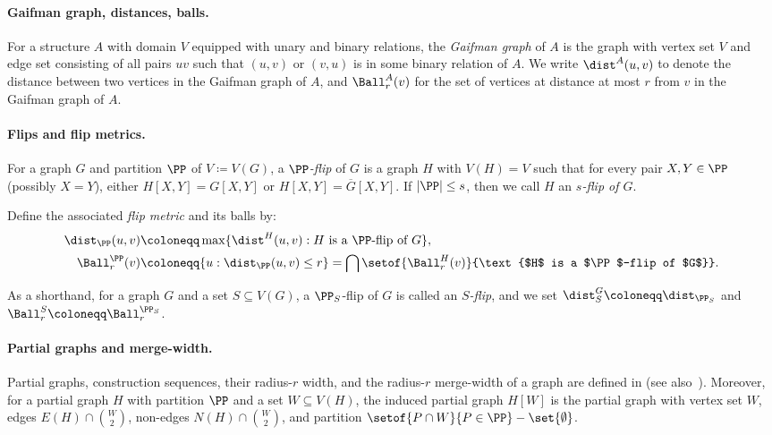 \paragraph{Gaifman graph, distances, balls.}
For a structure $A$ with domain $V$ equipped with unary and binary relations, the \emph{Gaifman graph} of $A$ is the graph
with vertex set $V$ and edge set consisting of all pairs $uv$ such that
$(u,v)$ or $(v,u)$ is in some binary relation of $A$.
We write $\dist^A(u,v)$ to denote the distance between two vertices in the Gaifman graph of $A$, and $\Ball^A_r(v)$  for the set of vertices at distance at most $r$ from $v$ in the Gaifman graph of $A$.

\paragraph{Flips and flip metrics.}
For a graph $G$ and partition $\PP$ of $V\coloneqq V(G)$, a \emph{$\PP$-flip} of $G$ is a graph $H$ with $V(H)=V$ such that for every pair $X,Y\in \PP$
(possibly $X=Y$), either
$H[X,Y]=G[X,Y]$ or $H[X,Y]=\overline G[X,Y]$.
If $|\PP| \leq s$, then we call $H$ an \emph{$s$-flip of $G$}.

Define the associated \emph{flip metric} and its balls by:
\begin{align*}
  \dist_\PP(u,v)&\coloneqq
  \max\{\dist^H(u,v):H\text{ is a $\PP$-flip of }G\},
  \\
  \Ball^\PP_r(v)&\coloneqq\{u:\dist_\PP(u,v)\le r\}=\bigcap\setof{\Ball^H_r(v)}{\text{$H$ is a $\PP$-flip of $G$}}.
\end{align*}

As a shorthand, for a graph $G$ and a set $S\subseteq V(G)$, a $\PP_S$-flip of $G$ is called an \emph{$S$-flip}, and we set $\dist_S^G \coloneqq \dist_{\PP_S}$ and $\Ball_r^S \coloneqq \Ball_r^{\PP_S}$.

\paragraph{Partial graphs and merge-width.}
Partial graphs, construction sequences, their radius-$r$ width, and the radius-$r$ merge-width of a graph are defined in  (see also~\cite{mw-stoc}).
Moreover, for a partial graph $H$ with partition $\PP$ and a set $W\subseteq V(H)$, the induced partial graph $H[W]$ is the partial graph with vertex set $W$,
edges $E(H)\cap {W\choose 2}$, non-edges
$N(H)\cap {W\choose 2}$, and partition $\setof{P\cap W}{P\in \PP}-\set{\emptyset}$.
